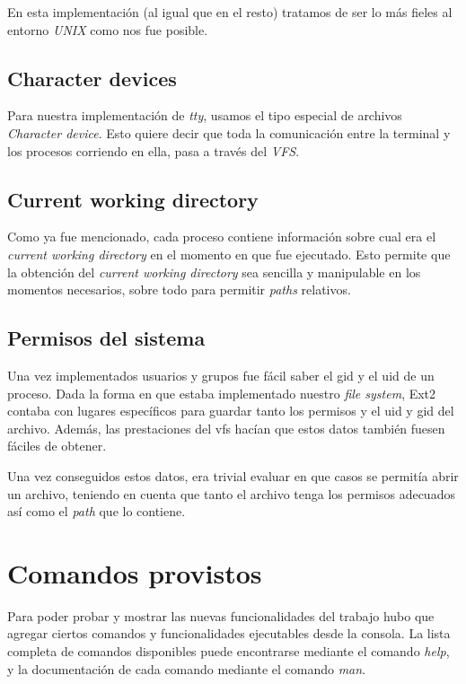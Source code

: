 \documentclass[a4paper,10pt]{article}
\begin{document}
En esta implementación (al igual que en el resto) tratamos de ser lo más fieles al entorno \textit{UNIX} como nos fue posible.

\subsection{Character devices}
Para nuestra implementación de \textit{tty}, usamos el tipo especial de archivos \textit{Character device}.
Esto quiere decir que toda la comunicación entre la terminal y los procesos corriendo en ella, pasa a través del \textit{VFS}.

\subsection{Current working directory}
    
Como ya fue mencionado, cada proceso contiene información sobre cual era el \textit{current working directory} en
el momento en que fue ejecutado. Esto permite que la obtención del \textit{current working directory} sea sencilla
y manipulable en los momentos necesarios, sobre todo para permitir \textit{paths} relativos.

    
\subsection{Permisos del sistema}
Una vez implementados usuarios y grupos fue fácil saber el gid y el uid de un proceso. Dada la forma en que estaba
implementado nuestro \textit{file system}, Ext2 contaba con lugares específicos para guardar tanto los permisos y el
uid y gid del archivo. Además, las prestaciones del vfs hacían que estos datos también fuesen fáciles de obtener.

Una vez conseguidos estos datos, era trivial evaluar en que casos se permitía abrir un archivo, teniendo en cuenta
que tanto el archivo tenga los permisos adecuados así como el \textit{path} que lo contiene.

\newpage
\section{Comandos provistos}
Para poder probar y mostrar las nuevas funcionalidades del trabajo hubo que agregar ciertos comandos y funcionalidades ejecutables desde la consola. 
La lista completa de comandos disponibles puede encontrarse mediante el comando \textit{help}, y la documentación de cada comando mediante el comando \textit{man}.
\end{document}
